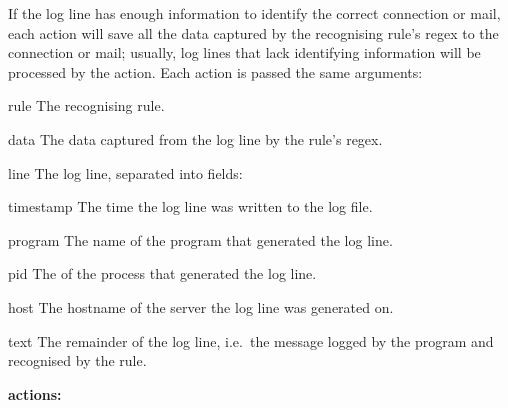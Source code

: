 If the log line has enough information to identify the correct connection
or mail, each action will save all the data captured by the recognising
rule's regex to the connection or mail; usually, log lines that lack
identifying information will be processed by the 
action.  Each action is passed the same arguments:

\begin{boldeqlist}

    \squeezeitems{}

    \item [rule] The recognising rule.

    \item [data] The data captured from the log line by the rule's regex.

    \item [line] The log line, separated into fields:

        \begin{boldeqlist}

            \squeezeitems{}

            \item [timestamp] The time the log line was written to the log
                file.

            \item [program] The name of the program that generated the log
                line.

            \item [pid] The  of the process that generated the
                log line.

            \item [host] The hostname of the server the log line was
                generated on.

            \item [text] The remainder of the log line, i.e.\ the message
                logged by the program and recognised by the rule.

        \end{boldeqlist}

\end{boldeqlist}

\newpage{}

\noindent{}\textbf{\parsernames{} actions:}

